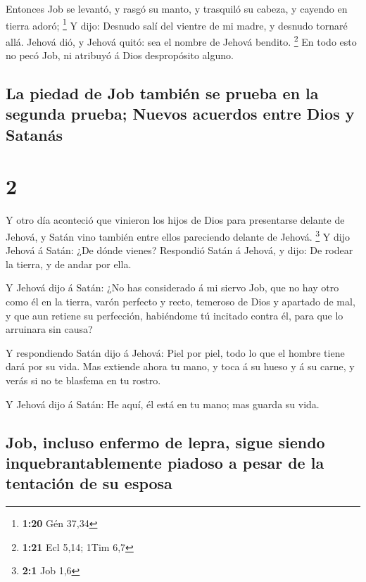  Entonces Job se levantó, y rasgó su manto, y trasquiló su
cabeza, y cayendo en tierra adoró; \footnote{\textbf{1:20} Gén 37,34}
 Y dijo: Desnudo salí del vientre de mi madre, y desnudo
tornaré allá. Jehová dió, y Jehová quitó: sea el nombre de Jehová
bendito. \footnote{\textbf{1:21} Ecl 5,14; 1Tim 6,7}  En
todo esto no pecó Job, ni atribuyó á Dios despropósito alguno.

\hypertarget{la-piedad-de-job-tambiuxe9n-se-prueba-en-la-segunda-prueba-nuevos-acuerdos-entre-dios-y-satanuxe1s}{%
\subsection{La piedad de Job también se prueba en la segunda prueba;
Nuevos acuerdos entre Dios y
Satanás}\label{la-piedad-de-job-tambiuxe9n-se-prueba-en-la-segunda-prueba-nuevos-acuerdos-entre-dios-y-satanuxe1s}}

\hypertarget{section-1}{%
\section{2}\label{section-1}}

 Y otro día aconteció que vinieron los hijos de Dios para
presentarse delante de Jehová, y Satán vino también entre ellos
pareciendo delante de Jehová. \footnote{\textbf{2:1} Job 1,6}
 Y dijo Jehová á Satán: ¿De dónde vienes? Respondió Satán á
Jehová, y dijo: De rodear la tierra, y de andar por ella.

 Y Jehová dijo á Satán: ¿No has considerado á mi siervo Job,
que no hay otro como él en la tierra, varón perfecto y recto, temeroso
de Dios y apartado de mal, y que aun retiene su perfección, habiéndome
tú incitado contra él, para que lo arruinara sin causa?

 Y respondiendo Satán dijo á Jehová: Piel por piel, todo lo
que el hombre tiene dará por su vida.  Mas extiende ahora tu
mano, y toca á su hueso y á su carne, y verás si no te blasfema en tu
rostro.

 Y Jehová dijo á Satán: He aquí, él está en tu mano; mas
guarda su vida.

\hypertarget{job-incluso-enfermo-de-lepra-sigue-siendo-inquebrantablemente-piadoso-a-pesar-de-la-tentaciuxf3n-de-su-esposa}{%
\subsection{Job, incluso enfermo de lepra, sigue siendo
inquebrantablemente piadoso a pesar de la tentación de su
esposa}\label{job-incluso-enfermo-de-lepra-sigue-siendo-inquebrantablemente-piadoso-a-pesar-de-la-tentaciuxf3n-de-su-esposa}}

